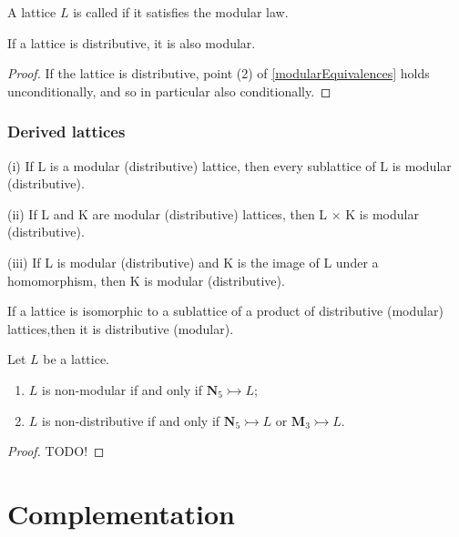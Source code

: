 \begin{definition}
A lattice $L$ is called  if it satisfies the modular law.
\end{definition}

\begin{lemma}
If a lattice is distributive, it is also modular.
\end{lemma}
\begin{proof}
If the lattice is distributive, point (2) of \ref{modularEquivalences} holds unconditionally, and so in particular also conditionally.
\end{proof}

\subsubsection{Derived lattices}

\begin{proposition}
(i) If L is a modular (distributive) lattice, then every sublattice of L
is modular (distributive).

(ii) If L and K are modular (distributive) lattices, then L × K is
modular (distributive).

(iii) If L is modular (distributive) and K is the image of L under a
homomorphism, then K is modular (distributive).
\end{proposition}
\begin{corollary}
If a lattice is isomorphic to a sublattice of a product
of distributive (modular) lattices,then it is distributive (modular).
\end{corollary}

\begin{theorem}
Let $L$ be a lattice.
\begin{enumerate}
\item $L$ is non-modular \textup{if and only if} $\mathbf{N}_5 \rightarrowtail L$;
\item $L$ is non-distributive \textup{if and only if} $\mathbf{N}_5 \rightarrowtail L$ or $\mathbf{M}_3 \rightarrowtail L$.
\end{enumerate}
\end{theorem}
\begin{proof}
TODO!
\end{proof}


\section{Complementation}
